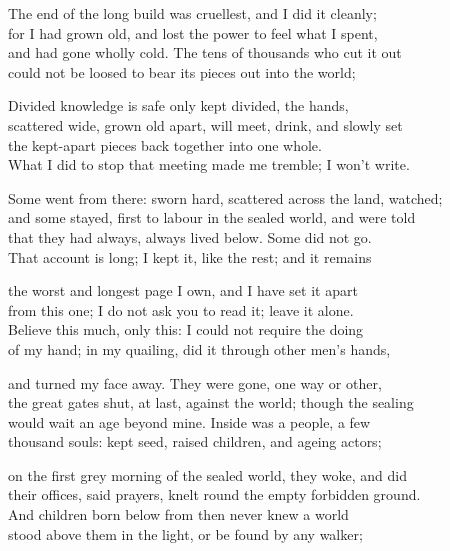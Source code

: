 \begin{founder}
The end of the long build was cruellest, and I did it cleanly;\\
for I had grown old, and lost the power to feel what I spent,\\
and had gone wholly cold. The tens of thousands who cut it out\\
could not be loosed to bear its pieces out into the world;\\
\medskip

Divided knowledge is safe only kept divided, the hands,\\
scattered wide, grown old apart, will meet, drink, and slowly set\\
the kept-apart pieces back together into one whole.\\
What I did to stop that meeting made me tremble; I won't write.\\
\medskip

Some went from there: sworn hard, scattered across the land, watched;\\
and some stayed, first to labour in the sealed world, and were told\\
that they had always, always lived below. Some did not go.\\
That account is long; I kept it, like the rest; and it remains\\
\medskip

the worst and longest page I own, and I have set it apart\\
from this one; I do not ask you to read it; leave it alone.\\
Believe this much, only this: I could not require the doing\\
of my hand; in my quailing, did it through other men's hands,\\
\medskip

and turned my face away. They were gone, one way or other,\\
the great gates shut, at last, against the world; though the sealing\\
would wait an age beyond mine. Inside was a people, a few\\
thousand souls: kept seed, raised children, and ageing actors;\\
\medskip

on the first grey morning of the sealed world, they woke, and did\\
their offices, said prayers, knelt round the empty forbidden ground.\\
And children born below from then never knew a world\\
stood above them in the light, or be found by any walker;\\
\medskip


\end{founder}
